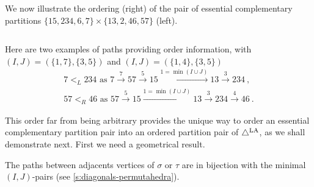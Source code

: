 \begin{example}
\label{ex:ECbijection}
We now illustrate the ordering (right) of the pair of essential complementary partitions $\{15,234,6,7\} \times \{13,2,46,57\}$ (left).
\begin{center}
$\quad$
\end{center}
Here are two examples of paths providing order information, with $(I,J)=(\{1,7\},\{3,5\})$ and $(I,J)=(\{1,4\},\{3,5\})$
\begin{align*}
	7 <_L 234 \text{ as } 7 \xrightarrow{7} 57 \xrightarrow{5} 15 \xrightarrow{1=\min(I\cup J)} 13 \xrightarrow{3} 234 \ , \\
	57 <_R 46 \text{ as } 57 \xrightarrow{5} 15 \xrightarrow{1=\min(I\cup J)} 13 \xrightarrow{3} 234 \xrightarrow{4} 46 \ .
\end{align*}
\end{example}

This order far from being arbitrary provides the unique way to order an essential complementary partition pair into an ordered partition pair of $\triangle^{\mathrm{LA}}$, as we shall demonstrate next.
First we need a geometrical result. 

\begin{proposition}
    \label{prop:geometrical-IJ}
    The paths between adjacents vertices of $\sigma$ or $\tau$ are in bijection with the minimal $(I,J)$-pairs (see \cref{s:diagonals-permutahedra}).
\end{proposition}

